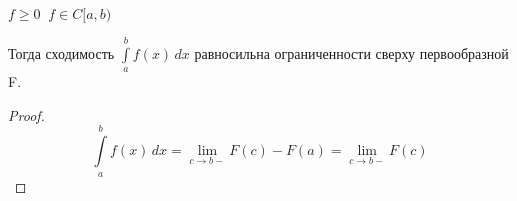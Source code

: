 
\begin{theorem} \thmslashn
$f\geq 0 \;\; f \in C[a,b)$

Тогда сходимость $\int\limits_a^b f(x) \, dx$ равносильна ограниченности сверху первообразной F.
\end{theorem}
\begin{proof} \thmslashn

$$\int\limits_a^b f(x) \, dx = \lim_{c \rightarrow b-} F(c) - F(a) = \lim_{c \rightarrow b-} F(c) $$

\end{proof}
